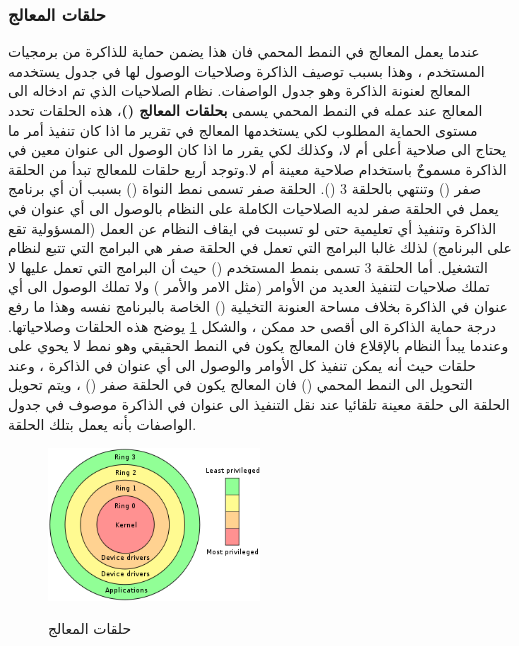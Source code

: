 \documentclass[document.tex]{subfiles}
\begin{document}
\subsubsection{حلقات المعالج }
عندما يعمل المعالج في النمط المحمي فان هذا يضمن حماية للذاكرة من برمجيات المستخدم ، وهذا بسبب توصيف الذاكرة وصلاحيات الوصول لها في جدول يستخدمه المعالج لعنونة الذاكرة وهو جدول الواصفات. نظام الصلاحيات الذي تم ادخاله الى المعالج عند عمله في النمط المحمي يسمى \textbf{بحلقات المعالج ()}، هذه الحلقات تحدد مستوى الحماية المطلوب لكي يستخدمها المعالج في تقرير ما اذا كان تنفيذ أمر ما يحتاج الى صلاحية أعلى أم لا، وكذلك لكي يقرر ما اذا كان الوصول الى عنوان معين في الذاكرة مسموحٌ باستخدام صلاحية معينة أم لا.وتوجد أربع حلقات للمعالج تبدأ من الحلقة صفر () وتنتهي بالحلقة 3 (). الحلقة صفر تسمى نمط النواة () بسبب أن أي برنامج يعمل في الحلقة صفر لديه الصلاحيات الكاملة على النظام بالوصول الى أي عنوان في الذاكرة وتنفيذ أي تعليمية حتى لو تسببت في ايقاف النظام عن العمل (المسؤولية تقع على البرنامج) لذلك غالبا البرامج التي تعمل في الحلقة صفر هي البرامج التي تتبع لنظام التشغيل. أما الحلقة 3 تسمى بنمط المستخدم () حيث أن البرامج التي تعمل عليها لا تملك صلاحيات لتنفيذ العديد من الأوامر (مثل الامر  والأمر ) ولا تملك الوصول الى أي عنوان في الذاكرة بخلاف مساحة العنونة التخيلية () الخاصة بالبرنامج نفسه وهذا ما رفع درجة حماية الذاكرة الى أقصى حد ممكن ، والشكل \ref{fig:rings} يوضح هذه الحلقات وصلاحياتها. وعندما يبدأ النظام بالإقلاع فان المعالج يكون في النمط الحقيقي وهو نمط لا يحوي على حلقات حيث أنه يمكن تنفيذ كل الأوامر والوصول الى أي عنوان في الذاكرة ، وعند التحويل الى النمط المحمي () فان المعالج يكون في الحلقة صفر () ، ويتم تحويل الحلقة الى حلقة معينة تلقائيا عند نقل التنفيذ الى عنوان في الذاكرة موصوف في جدول الواصفات بأنه يعمل بتلك الحلقة.

\begin{figure}[h!]
  \caption{حلقات المعالج}
  \centering
   \includegraphics[width=0.5\textwidth]{../img/rings}
  \label{fig:rings} 
\end{figure}
\end{document}
